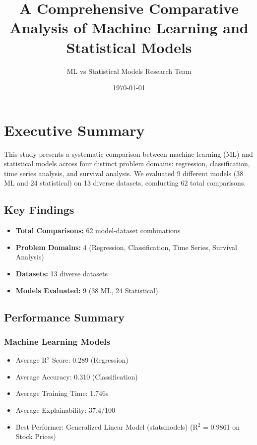 \documentclass[11pt,a4paper]{article}
\title{A Comprehensive Comparative Analysis of Machine Learning and Statistical Models}
\author{ML vs Statistical Models Research Team}
\date{\today}
\begin{document}
\maketitle

\tableofcontents
\newpage

\section{Executive Summary}

This study presents a systematic comparison between machine learning (ML) and statistical models across four distinct problem domains: regression, classification, time series analysis, and survival analysis. We evaluated 9 different models (38 ML and 24 statistical) on 13 diverse datasets, conducting 62 total comparisons.

\subsection{Key Findings}

\begin{itemize}
\item \textbf{Total Comparisons:} 62 model-dataset combinations
\item \textbf{Problem Domains:} 4 (Regression, Classification, Time Series, Survival Analysis)
\item \textbf{Datasets:} 13 diverse datasets
\item \textbf{Models Evaluated:} 9 (38 ML, 24 Statistical)
\end{itemize}

\subsection{Performance Summary}

\subsubsection{Machine Learning Models}
\begin{itemize}
\item Average R$^2$ Score: 0.289 (Regression)
\item Average Accuracy: 0.310 (Classification)
\item Average Training Time: 1.746s
\item Average Explainability: 37.4/100
\item Best Performer: Generalized Linear Model (statsmodels) (R$^2$ = 0.9861 on Stock Prices)
\end{itemize}
\end{document}

